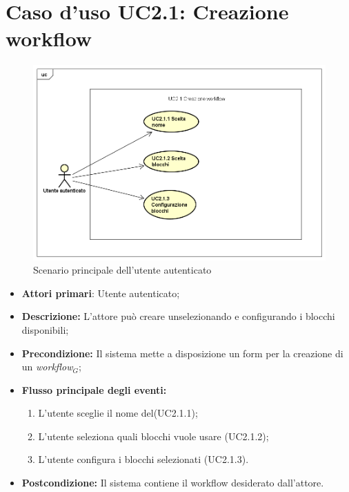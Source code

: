 \section{Caso d'uso UC2.1: Creazione workflow}
\begin{figure} [h]
	\centering
	\includegraphics[scale=0.4]{./Diagram/UC2-1.png}
	\caption{Scenario principale dell'utente autenticato }\label{}
\end{figure}
\begin{itemize}
	\item \textbf{Attori primari}: Utente autenticato;
	\item \textbf{Descrizione:} L'attore può creare unselezionando e configurando i blocchi disponibili;
	\item \textbf{Precondizione:} Il sistema mette a disposizione un form per la creazione di un \textit{workflow$_{G}$};
	\item \textbf{Flusso principale degli eventi:}
	\begin{enumerate}
		\item L'utente sceglie il nome del(UC2.1.1);
		\item L'utente seleziona quali blocchi vuole usare (UC2.1.2);
		\item L'utente configura i blocchi selezionati (UC2.1.3).
	\end{enumerate}
	\item \textbf{Postcondizione:} Il sistema contiene il workflow desiderato dall'attore.
\end{itemize}
